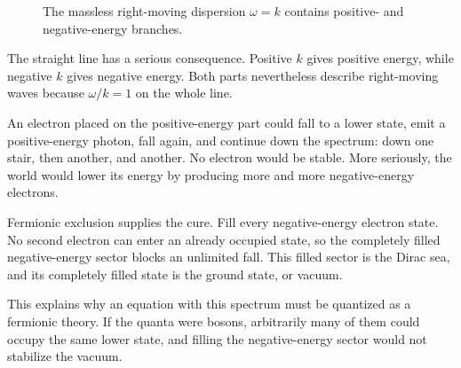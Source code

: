 \begin{figure}[htbp]
\centering
{}
\caption{The massless right-moving dispersion \(\omega=k\) contains positive- and negative-energy branches.}
\end{figure}

The straight line has a serious consequence. Positive \(k\) gives positive energy, while negative \(k\) gives negative energy. Both parts nevertheless describe right-moving waves because \(\omega/k=1\) on the whole line.

An electron placed on the positive-energy part could fall to a lower state, emit a positive-energy photon, fall again, and continue down the spectrum: down one stair, then another, and another. No electron would be stable. More seriously, the world would lower its energy by producing more and more negative-energy electrons.

Fermionic exclusion supplies the cure. Fill every negative-energy electron state. No second electron can enter an already occupied state, so the completely filled negative-energy sector blocks an unlimited fall. This filled sector is the Dirac sea, and its completely filled state is the ground state, or vacuum.

\begin{classroomqa}
\end{classroomqa}

This explains why an equation with this spectrum must be quantized as a fermionic theory. If the quanta were bosons, arbitrarily many of them could occupy the same lower state, and filling the negative-energy sector would not stabilize the vacuum.

